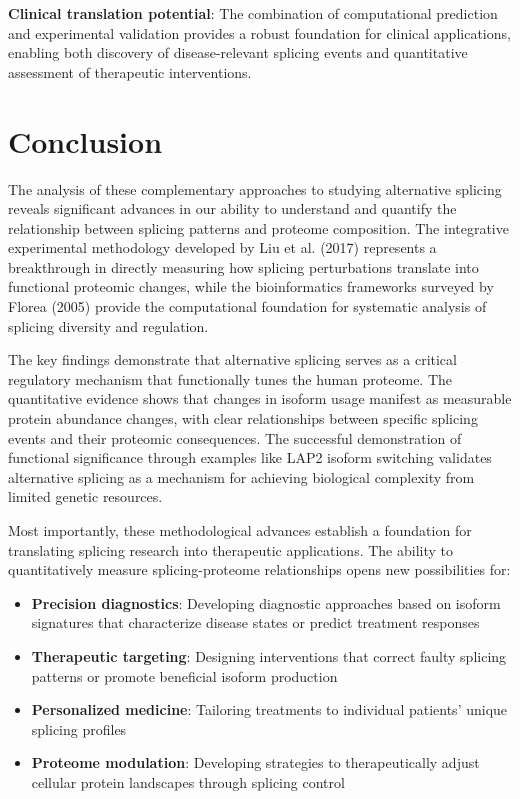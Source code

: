 \documentclass[12pt,a4paper]{article}
\begin{document}
\textbf{Clinical translation potential}: The combination of computational prediction and experimental validation provides a robust foundation for clinical applications, enabling both discovery of disease-relevant splicing events and quantitative assessment of therapeutic interventions.

\section{Conclusion}

The analysis of these complementary approaches to studying alternative splicing reveals significant advances in our ability to understand and quantify the relationship between splicing patterns and proteome composition. The integrative experimental methodology developed by Liu et al. (2017) represents a breakthrough in directly measuring how splicing perturbations translate into functional proteomic changes, while the bioinformatics frameworks surveyed by Florea (2005) provide the computational foundation for systematic analysis of splicing diversity and regulation.

The key findings demonstrate that alternative splicing serves as a critical regulatory mechanism that functionally tunes the human proteome. The quantitative evidence shows that changes in isoform usage manifest as measurable protein abundance changes, with clear relationships between specific splicing events and their proteomic consequences. The successful demonstration of functional significance through examples like LAP2 isoform switching validates alternative splicing as a mechanism for achieving biological complexity from limited genetic resources.

Most importantly, these methodological advances establish a foundation for translating splicing research into therapeutic applications. The ability to quantitatively measure splicing-proteome relationships opens new possibilities for:

\begin{itemize}
    \item \textbf{Precision diagnostics}: Developing diagnostic approaches based on isoform signatures that characterize disease states or predict treatment responses
    \item \textbf{Therapeutic targeting}: Designing interventions that correct faulty splicing patterns or promote beneficial isoform production
    \item \textbf{Personalized medicine}: Tailoring treatments to individual patients' unique splicing profiles
    \item \textbf{Proteome modulation}: Developing strategies to therapeutically adjust cellular protein landscapes through splicing control
\end{itemize}
\end{document}

